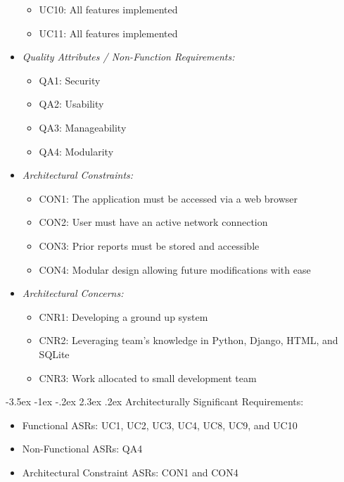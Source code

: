 \documentclass[11pt]{article}
\makeatletter
\renewcommand\section{\@startsection{section}{1}{\z@}%
                                  {-3.5ex \@plus -1ex \@minus -.2ex}%
                                  {2.3ex \@plus.2ex}%
                                  {\normalfont\large\bfseries}}
\renewcommand\section{\@startsection{section}{1}{\z@}%
                                  {-3.5ex \@plus -1ex \@minus -.2ex}%
                                  {2.3ex \@plus.2ex}%
                                  {\normalfont\large\bfseries}}
\makeatother
\begin{document}
\begin{itemize}
\begin{itemize}
                \item UC10: All features implemented
                \item UC11: All features implemented
            \end{itemize}
        \item \textit{Quality Attributes / Non-Function Requirements:}
            \begin{itemize}
                \item QA1: Security 
                \item QA2: Usability
                \item QA3: Manageability
                \item QA4: Modularity
            \end{itemize}
        \item \textit{Architectural Constraints:}
            \begin{itemize}
                \item CON1: The application must be accessed via a web browser
                \item CON2: User must have an active network connection
                \item CON3: Prior reports must be stored and accessible
                \item CON4: Modular design allowing future modifications with ease
            \end{itemize}
        \item \textit{Architectural Concerns:}
            \begin{itemize}
                \item CNR1: Developing a ground up system 
                \item CNR2: Leveraging team’s knowledge in Python, Django, HTML, and SQLite
                \item CNR3: Work allocated to small development team
            \end{itemize}
    \end{itemize}

\section{Architecturally Significant Requirements:}
    \begin{itemize}
        \item Functional ASRs: UC1, UC2, UC3, UC4, UC8, UC9, and UC10
        \item Non-Functional ASRs: QA4
        \item Architectural Constraint ASRs: CON1 and CON4
    \end{itemize}
\end{document}
